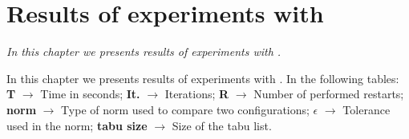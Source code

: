 \chapter{Results of experiments with \grp}
\label{app:grp}
\textit{In this chapter we presents results of experiments with \grp.}
\vfill
\minitoc
\newpage

In this chapter we presents results of experiments with \grp. In the following tables: \textbf{T} $\rightarrow$ Time in seconds; \textbf{It.} $\rightarrow$ Iterations; \textbf{R} $\rightarrow$ Number of performed restarts; \textbf{norm} $\rightarrow$ Type of norm used to compare two configurations; \textbf{$\epsilon$} $\rightarrow$ Tolerance used in the norm; \textbf{tabu size} $\rightarrow$ Size of the tabu list.


